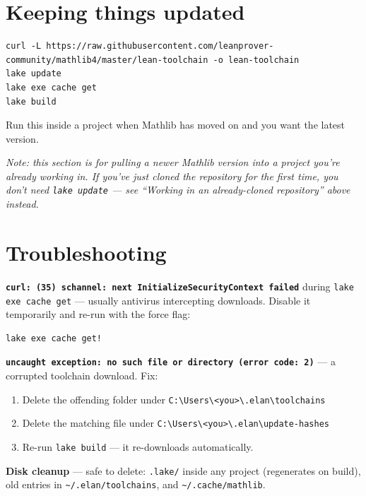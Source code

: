 \section{Keeping things updated}

\begin{verbatim}
curl -L https://raw.githubusercontent.com/leanprover-community/mathlib4/master/lean-toolchain -o lean-toolchain
lake update
lake exe cache get
lake build
\end{verbatim}

Run this inside a project when Mathlib has moved on and you want the latest version.

\emph{Note: this section is for pulling a newer Mathlib version into a project you're already working in. If you've just cloned the repository for the first time, you don't need \texttt{lake update} --- see ``Working in an already-cloned repository'' above instead.}

\section{Troubleshooting}

\textbf{\texttt{curl: (35) schannel: next InitializeSecurityContext failed}} during \texttt{lake exe cache get} --- usually antivirus intercepting downloads. Disable it temporarily and re-run with the force flag:

\begin{verbatim}
lake exe cache get!
\end{verbatim}

\textbf{\texttt{uncaught exception: no such file or directory (error code: 2)}} --- a corrupted toolchain download. Fix:

\begin{enumerate}
  \item Delete the offending folder under \texttt{C:\textbackslash{}Users\textbackslash{}<you>\textbackslash{}.elan\textbackslash{}toolchains}
  \item Delete the matching file under \texttt{C:\textbackslash{}Users\textbackslash{}<you>\textbackslash{}.elan\textbackslash{}update-hashes}
  \item Re-run \texttt{lake build} --- it re-downloads automatically.
\end{enumerate}

\textbf{Disk cleanup} --- safe to delete: \texttt{.lake/} inside any project (regenerates on build), old entries in \texttt{\textasciitilde{}/.elan/toolchains}, and \texttt{\textasciitilde{}/.cache/mathlib}.

